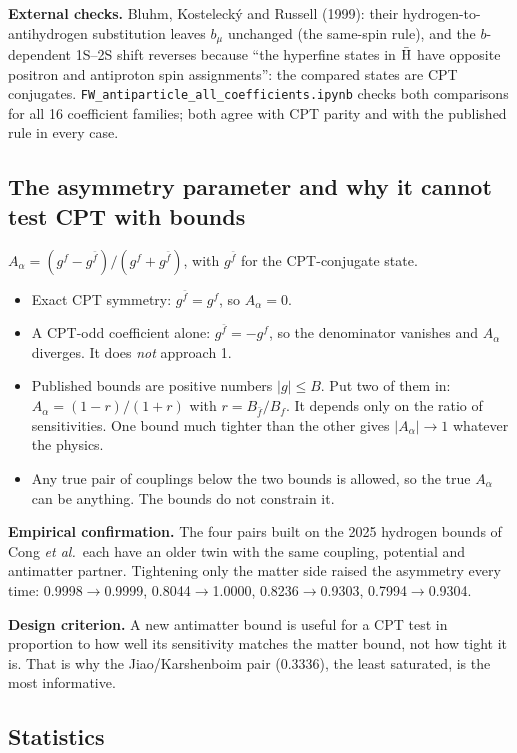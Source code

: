 \documentclass[11pt,a4paper]{article}
\newcommand{\Aa}{A_\alpha}
\newcommand{\gfb}{g^{\bar f}}
\begin{document}
\textbf{External checks.} Bluhm, Kostelecký and Russell (1999): their
hydrogen-to-antihydrogen substitution leaves $b_\mu$ unchanged (the
same-spin rule), and the $b$-dependent 1S--2S shift reverses because ``the
hyperfine states in $\bar{\rm H}$ have opposite positron and antiproton
spin assignments'': the compared states are CPT conjugates.
\texttt{FW\_antiparticle\_all\_coefficients.ipynb} checks both
comparisons for all 16 coefficient families; both agree with CPT parity
and with the published rule in every case.

\subsection{The asymmetry parameter and why it cannot test CPT with bounds}

$\Aa=(g^f-\gfb)/(g^f+\gfb)$, with $\gfb$ for the CPT-conjugate state.

\begin{itemize}[leftmargin=1.2em]
\item Exact CPT symmetry: $\gfb=g^f$, so $\Aa=0$.
\item A CPT-odd coefficient alone: $\gfb=-g^f$, so the denominator
vanishes and $\Aa$ diverges. It does \emph{not} approach 1.
\item Published bounds are positive numbers $|g|\le B$. Put two of them
in: $\Aa=(1-r)/(1+r)$ with $r=B_{\bar f}/B_f$. It depends only on the
ratio of sensitivities. One bound much tighter than the other gives
$|\Aa|\to1$ whatever the physics.
\item Any true pair of couplings below the two bounds is allowed, so the
true $\Aa$ can be anything. The bounds do not constrain it.
\end{itemize}

\textbf{Empirical confirmation.} The four pairs built on the 2025 hydrogen
bounds of Cong \textit{et al.}\ each have an older twin with the same
coupling, potential and antimatter partner. Tightening only the matter
side raised the asymmetry every time: 0.9998$\to$0.9999,
0.8044$\to$1.0000, 0.8236$\to$0.9303, 0.7994$\to$0.9304.

\textbf{Design criterion.} A new antimatter bound is useful for a CPT test
in proportion to how well its sensitivity matches the matter bound, not
how tight it is. That is why the Jiao/Karshenboim pair (0.3336), the least
saturated, is the most informative.

\subsection{Statistics}
\end{document}
